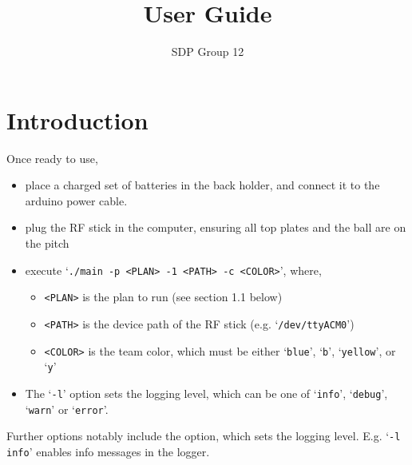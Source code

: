 ﻿\documentclass[12pt,a4paper]{article}
\author{SDP Group 12}
\title{User Guide}
\begin{document}
\maketitle




\section{Introduction}

Once ready to use, 

\begin{itemize}
    \item place a charged set of batteries in the back holder, and connect it to the arduino power cable.
    \item plug the RF stick in the computer, ensuring all top plates and the ball are on the pitch
    \item execute `\texttt{./main -p <PLAN> -1 <PATH> -c <COLOR>}', where,
    \begin{itemize}
	\item \texttt{<PLAN>} is the plan to run (see section 1.1 below)
	\item \texttt{<PATH>} is the device path of the RF stick (e.g. `\verb$/dev/ttyACM0$')
	\item \texttt{<COLOR>} is the team color, which must be either `\texttt{blue}', `\texttt{b}', `\texttt{yellow}', or `\texttt{y}'
    \end{itemize}
    \item The `\texttt{-l}' option sets the logging level, which can be one of `\texttt{info}', `\texttt{debug}', `\texttt{warn}' or `\texttt{error}'.
\end{itemize}

Further options notably include the 
option, which sets the logging level. E.g. `\texttt{-l info}' enables info
messages in the logger.
\end{document}
